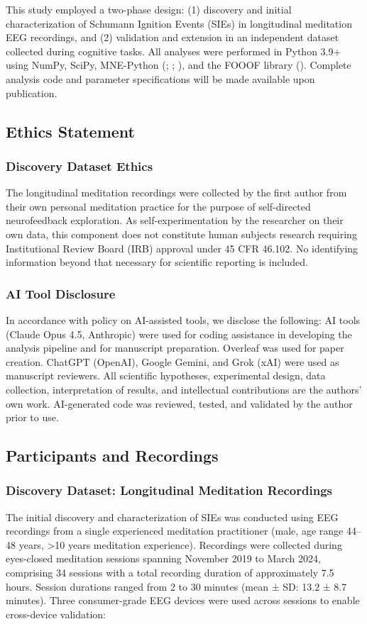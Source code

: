 \documentclass[11pt,a4paper]{article}
\begin{document}
This study employed a two-phase design: (1) discovery and initial characterization of Schumann Ignition Events (SIEs) in longitudinal meditation EEG recordings, and (2) validation and extension in an independent dataset collected during cognitive tasks. All analyses were performed in Python 3.9+ using NumPy, SciPy, MNE-Python (\cite{harris2020numpy}; \cite{virtanen2020scipy}; \cite{gramfort2013mne}), and the FOOOF library (\cite{donoghue2020fooof}). Complete analysis code and parameter specifications will be made available upon publication.
\subsection{Ethics Statement}
\subsubsection{Discovery Dataset Ethics}
The longitudinal meditation recordings were collected by the first author from their own personal meditation practice for the purpose of self-directed neurofeedback exploration. As self-experimentation by the researcher on their own data, this component does not constitute human subjects research requiring Institutional Review Board (IRB) approval under 45 CFR 46.102. No identifying information beyond that necessary for scientific reporting is included.

\subsubsection{AI Tool Disclosure}
In accordance with policy on AI-assisted tools, we disclose the following: AI tools (Claude Opus 4.5, Anthropic) were used for coding assistance in developing the analysis pipeline and for manuscript preparation. Overleaf was used for paper creation. ChatGPT (OpenAI), Google Gemini, and Grok (xAI) were used as manuscript reviewers. All scientific hypotheses, experimental design, data collection, interpretation of results, and intellectual contributions are the authors' own work. AI-generated code was reviewed, tested, and validated by the author prior to use.

\subsection{Participants and Recordings}

\subsubsection{Discovery Dataset: Longitudinal Meditation Recordings}
The initial discovery and characterization of SIEs was conducted using EEG recordings from a single experienced meditation practitioner (male, age range 44–48 years, >10 years meditation experience). Recordings were collected during eyes-closed meditation sessions spanning November 2019 to March 2024, comprising 34 sessions with a total recording duration of approximately 7.5 hours. Session durations ranged from 2 to 30 minutes (mean ± SD: 13.2 ± 8.7 minutes). Three consumer-grade EEG devices were used across sessions to enable cross-device validation:
\end{document}

